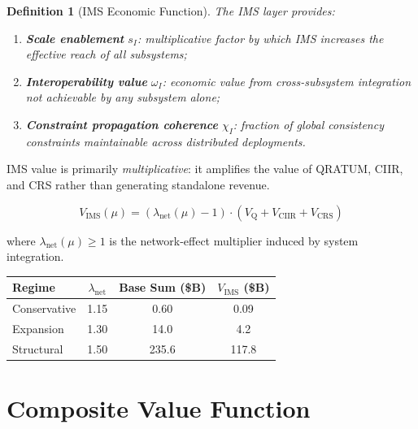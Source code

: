 \documentclass[11pt,a4paper]{article}
\newtheorem{definition}{Definition}[section]
\theoremstyle{remark}
\newcommand{\VQ}{V_{\mathrm{Q}}}
\newcommand{\VCIIR}{V_{\mathrm{CIIR}}}
\newcommand{\VCRS}{V_{\mathrm{CRS}}}
\newcommand{\VIMS}{V_{\mathrm{IMS}}}
\begin{document}
\begin{definition}[IMS Economic Function]
\label{def:ims_econ}
The IMS layer provides:
\begin{enumerate}[nosep]
  \item \textbf{Scale enablement} $s_I$: multiplicative factor by
        which IMS increases the effective reach of all subsystems;
  \item \textbf{Interoperability value} $\omega_I$: economic value
        from cross-subsystem integration not achievable by any
        subsystem alone;
  \item \textbf{Constraint propagation coherence} $\chi_I$: fraction
        of global consistency constraints maintainable across
        distributed deployments.
\end{enumerate}
\end{definition}

IMS value is primarily \emph{multiplicative}: it amplifies the value
of QRATUM, CIIR, and CRS rather than generating standalone revenue.

\begin{equation}
  \VIMS(\mu) = (\lambda_{\mathrm{net}}(\mu) - 1) \cdot
  (\VQ + \VCIIR + \VCRS)
  \label{eq:vims}
\end{equation}

where $\lambda_{\mathrm{net}}(\mu) \geq 1$ is the network-effect
multiplier induced by system integration.

\begin{center}
\renewcommand{\arraystretch}{1.2}
\begin{tabular}{lccc}
\toprule
\textbf{Regime} & $\lambda_{\mathrm{net}}$ & \textbf{Base Sum (\$B)} & $\VIMS$ \textbf{(\$B)} \\
\midrule
Conservative & 1.15 & 0.60  & 0.09  \\
Expansion    & 1.30 & 14.0  & 4.2   \\
Structural   & 1.50 & 235.6 & 117.8 \\
\bottomrule
\end{tabular}
\end{center}


\section{Composite Value Function}
\label{sec:value_function}
\end{document}
